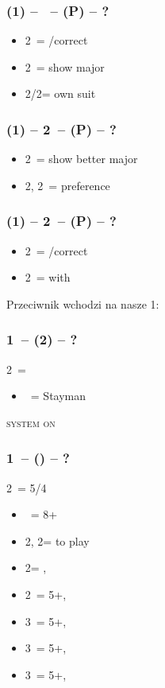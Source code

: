 \documentclass[12pt, a4paper]{article}
\begin{document}
\subsubsection*{(1\ntx) -- \dbl\ -- (P) -- ?}
\begin{itemize}
    \item 2\clubs\ = \pass/correct
    \item 2\diams\ = show major
    \item 2\hearts/2\spades = own suit
\end{itemize}

\subsubsection*{(1\ntx) -- 2\clubs\ -- (P) -- ?}
\begin{itemize}
    \item 2\diams\ = show better major
    \item 2\hearts, 2\spades\ = preference
\end{itemize}

\subsubsection*{(1\ntx) -- 2\diams\ -- (P) -- ?}
\begin{itemize}
    \item 2\hearts\ = \pass/correct
    \item 2\spades\ = \inv with \hearts
\end{itemize}

Przeciwnik wchodzi na nasze 1\nt:

\subsubsection*{1\ntx\ -- (2\clubs) -- ?}
2\clubs\ = \clubs
\begin{itemize}
    \item \dbl\ = Stayman
\end{itemize}

\textsc{system on}

\subsubsection*{1\ntx\ -- (\alrts{2\clubs}) -- ?}
2\clubs\ = 5/4 \major
\begin{itemize}
    \item \dbl\ = 8+
    \item 2\diams, 2\hearts = to play
    \item 2\spades = \minor, \invp
    \item 2\nt\ = 5+\clubs, \invp
    \item 3\clubs\ = 5+\diams, \invp
    \item 3\diams\ = 5+\hearts, \invp
    \item 3\hearts\ = 5+\spades, \invp
\end{itemize}
\end{document}
